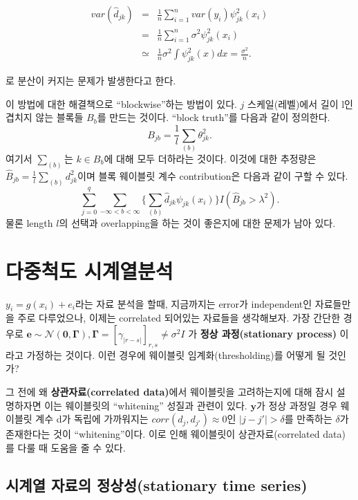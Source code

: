 \documentclass[b5paper,]{book}
\theoremstyle{definition}
\theoremstyle{definition}
\theoremstyle{definition}
\theoremstyle{remark}
\begin{document}
\begin{eqnarray*}
var(\hat{d}_{jk})&=&\frac{1}{n}\sum_{i=1}^{n}var(y_{i})\psi_{jk}^{2}(x_{i})\\
&=&\frac{1}{n}\sum_{i=1}^{n}\sigma^{2}\psi_{jk}^{2}(x_{i})\\
&\simeq& \frac{1}{n}\sigma^{2}\int \psi_{jk}^{2}(x)dx=\frac{\sigma^{2}}{n}.
\end{eqnarray*}

로 분산이 커지는 문제가 발생한다고 한다.

이 방법에 대한 해결책으로 ``blockwise''하는 방법이 있다. \(j\)
스케일(레벨)에서 길이 l인 겹치지 않는 블록들 \(B_{b}\)를 만드는 것이다.
``block truth''를 다음과 같이 정의한다.
\[B_{jb}=\frac{1}{l}\sum_{(b)}\theta_{jk}^{2}.\] 여기서 \(\sum_{(b)}\)는
\(k \in B_{b}\)에 대해 모두 더하라는 것이다. 이것에 대한 추정량은
\(\hat{B}_{jb}=\frac{1}{l}\sum_{(b)}d_{jk}^{2}\)이며 블록 웨이블릿 계수
contribution은 다음과 같이 구할 수 있다.
\[\sum_{j=0}^{q}\sum_{-\infty < b < \infty} \{ \sum_{(b)}\hat{d}_{jk}\psi_{jk}(x_{i})\}I(\hat{B}_{jb} > \lambda^{2}).\]
물론 length \(l\)의 선택과 overlapping을 하는 것이 좋은지에 대한 문제가
남아 있다.

\chapter{다중척도 시계열분석}\label{multiscalets}

\(y_{i}=g(x_{i})+e_{i}\)라는 자료 분석을 할때, 지금까지는 error가
independent인 자료들만을 주로 다루었으나, 이제는 correlated 되어있는
자료들을 생각해보자. 가장 간단한 경우로
\(\mathbf{e} \sim \mathcal{N}(\mathbf{0},\boldsymbol{\Gamma}), \boldsymbol{\Gamma}=[ \gamma_{|r-s|}]_{r,s} \neq \sigma^{2}I\)
가 \textbf{정상 과정(stationary process)} 이라고 가정하는 것이다. 이런
경우에 웨이블릿 임계화(thresholding)를 어떻게 될 것인가?

그 전에 왜 \textbf{상관자료(correlated data)}에서 웨이블릿을
고려하는지에 대해 잠시 설명하자면 이는 웨이블릿의 ``whitening'' 성질과
관련이 있다. \(\mathbf{y}\)가 정상 과정일 경우 웨이블릿 계수 d가 독립에
가까워지는 \(corr(d_{j},d_{j'})\approx 0\)인 \(|j-j'|>\delta\)를
만족하는 \(\delta\)가 존재한다는 것이 ``whitening''이다. 이로 인해
웨이블릿이 상관자료(correlated data)를 다룰 때 도움을 줄 수 있다.

\section{시계열 자료의 정상성(stationary time
series)}\label{--stationary-time-series}
\end{document}
